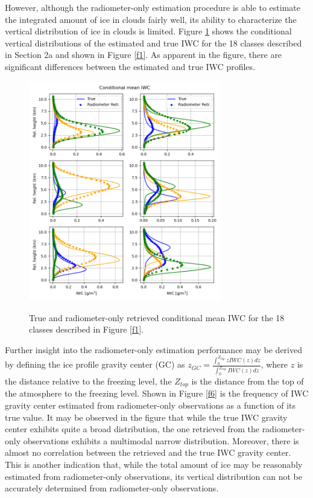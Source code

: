 \documentclass{ametsocV6.1}
\begin{document}
However, although the radiometer-only estimation procedure is able to estimate the integrated amount of ice in clouds fairly
well, its ability to characterize the vertical distribution of ice in clouds is limited.  Figure \ref{f5} shows the
conditional vertical distributions of the estimated and true IWC for the 18 classes described in Section 2a 
and shown in Figure \ref{f1}. As apparent in the figure, there are significant differences between the
estimated and true IWC profiles. 
\begin{figure}[t]
    \centering
    \includegraphics[width=0.75\textwidth,angle=0]{./Figs/fig05.png}\\
    \caption{True and radiometer-only retrieved conditional mean IWC for the 18 classes described in 
    Figure \ref{f1}.}\label{f5}
\end{figure}

Further insight into the radiometer-only estimation performance may be derived by defining the ice profile gravity center 
(GC) as $z_{GC}=\frac {\int_0^{Z_{top}}zIWC(z)dz} {\int_0^{Z_{top}}IWC(z)dz}$, where $z$ is the distance relative to 
the freezing level, the $Z_{top}$ is the distance from the top of the atmosphere to the freezing level.  
Shown in Figure \ref{f6} is the frequency of IWC gravity center
estimated from radiometer-only observations as a function of its true value.  It may be observed in the figure that while 
the true IWC gravity center exhibits quite a broad distribution, the one retrieved from the radiometer-only 
observations exhibits a multimodal narrow distribution. Moreover, there is almost no correlation between the retrieved 
and the true IWC gravity center.  This is another indication that, while the total amount of ice may be reasonably 
estimated from radiometer-only observations, its vertical distribution can not be 
accurately determined from 
radiometer-only observations.
\end{document}
